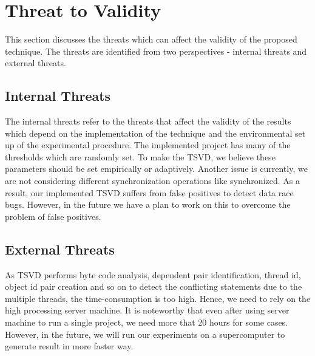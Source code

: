 \section{Threat to Validity}
\label{lbl:threat}

This section discusses the threats which can affect the validity of the
proposed technique. The threats are identified from two perspectives -
internal threats and external threats.


\subsection{Internal Threats}
The internal threats refer to the threats that affect                                                                                         the validity of the results which depend on the implementation of the technique
and the environmental set up of the experimental procedure. The implemented project has many of the thresholds which are randomly set. To make
 the TSVD, we believe these parameters should be set empirically or adaptively. Another issue is currently, we are not considering different
 synchronization operations like synchronized. As a result, our implemented TSVD suffers from false positives to detect data race bugs.
 However, in the future we have a plan to work on this to overcome the problem of false positives.

 \subsection{External Threats} As TSVD performs byte code analysis, dependent
 pair identification, thread id, object id pair creation and so on to detect the                                                               conflicting statements due to the multiple threads, the time-consumption is too
 high. Hence, we need to rely on the high processing server machine. It is                                                                     noteworthy that even after using server machine to run a single
 project, we need more that $20$ hours for some cases. However, in the future,                                                                 we will run our experiments on a supercomputer to generate result in more
 faster way.




